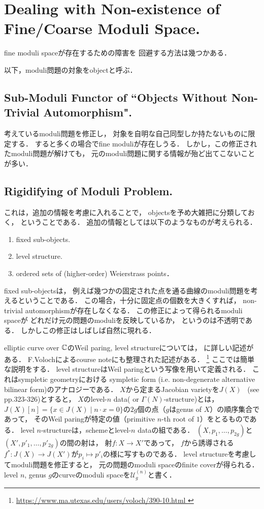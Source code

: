 \documentclass[a4paper]{jsarticle}
\newcommand{\spM}{\mathcal{U}}
\begin{document}
\section{Dealing with Non-existence of Fine/Coarse Moduli Space.}
    fine moduli spaceが存在するための障害を
    回避する方法は幾つかある．
    
    以下，moduli問題の対象をobjectと呼ぶ．

    \subsection{Sub-Moduli Functor of ``Objects Without Non-Trivial Automorphism".}
    考えているmoduli問題を修正し，
    対象を自明な自己同型しか持たないものに限定する．
    すると多くの場合でfine moduliが存在しうる．
    しかし，この修正されたmoduli問題が解けても，
    元のmoduli問題に関する情報が殆ど出てこないことが多い．

    \subsection{Rigidifying of Moduli Problem.}
    これは，追加の情報を考慮に入れることで，
    objectsを予め大雑把に分類しておく，
    ということである．
    追加の情報としては以下のようなものが考えられる．
    \begin{enumerate}
        \item fixed sub-objects.
        \item level structure.
        \item ordered sets of (higher-order) Weierstrass points．
    \end{enumerate}

    fixed sub-objectsは，
    例えば幾つかの固定された点を通る曲線のmoduli問題を考えるということである．
    この場合，十分に固定点の個数を大きくすれば，
    non-trivial automorphismが存在しなくなる．
    この修正によって得られるmoduli spaceが
    どれだけ元の問題のmoduliを反映しているか，
    というのは不透明である．
    しかしこの修正はしばしば自然に現れる．

    elliptic curve over $\mathbb{C}$のWeil paring, level structureについては，
    \cite{DiaShur}に詳しい記述がある．
    F.Volochによるcourse noteにも整理された記述がある．
    \footnote{\url{ https://www.ma.utexas.edu/users/voloch/390-10.html }}
    ここでは簡単な説明をする．
    level structureはWeil paringという写像を用いて定義される．
    これはsympletic geometryにおける
    sympletic form (i.e. non-degenerate alternative bilinear form)のアナロジーである．
    $X$から定まるJacobian varietyを$J(X)$ \ (see \cite{HarAG} pp.323-326)とすると，
    $X$のlevel-$n$ data( or $\Gamma(N)$-structure)とは，
    $J(X)[n]=\{x \in J(X) \mid n \cdot x=0 \}$の$2g$個の点（$g$はgenus of $X$）の順序集合であって，
    そのWeil paringが特定の値（primitive $n$-th root of $1$）をとるものである．
    level $n$-structureは，schemeとlevel-$n$ dataの組である．
    $(X, p_1, \dots, p_{2g})$と$(X', p'_1, \dots, p'_{2g})$の間の射は，
    射$f:X \to X'$であって，
    $f$から誘導される$f^*: J(X) \to J(X')$が$p_i \mapsto p'_i$の様に写すものである．
    level structureを考慮してmoduli問題を修正すると，
    元の問題のmoduli spaceのfinite coverが得られる．
    level $n$, genus $g$のcurveのmoduli spaceを$\spM_g^{(n)}$と書く．
\end{document}
